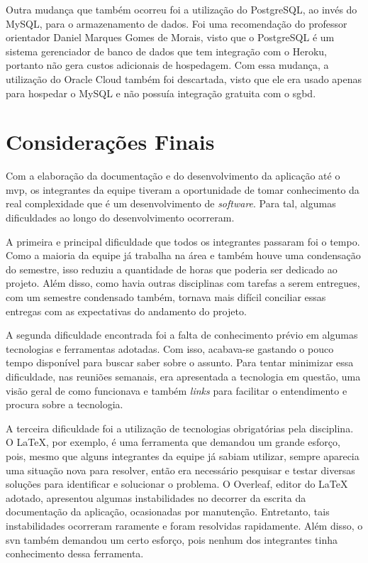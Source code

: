 \documentclass[
    12pt,               %
    openright,          %
    oneside,
    a4paper,            %
    english,            %
    brazil              %
    ]{ifsp-spo-inf-ctds} %
\begin{document}
Outra mudança que também ocorreu foi a utilização do PostgreSQL, ao invés do MySQL, para o armazenamento de dados. Foi uma recomendação do professor orientador Daniel Marques Gomes de Morais, visto que o PostgreSQL é um sistema gerenciador de banco de dados que tem integração com o Heroku, portanto não gera custos adicionais de hospedagem. Com essa mudança, a utilização do Oracle Cloud também foi descartada, visto que ele era usado apenas para hospedar o MySQL e não possuía integração gratuita com o \ac{sgbd}.



\chapter[Considerações Finais]{Considerações Finais}

Com a elaboração da documentação e do desenvolvimento da aplicação até o \ac{mvp}, os integrantes da equipe tiveram a oportunidade de tomar conhecimento da real complexidade que é um desenvolvimento de \textit{\gls{software}}. Para tal, algumas dificuldades ao longo do desenvolvimento ocorreram. 

A primeira e principal dificuldade que todos os integrantes passaram foi o tempo. Como a maioria da equipe já trabalha na área e também houve uma condensação do semestre, isso reduziu a quantidade de horas que poderia ser dedicado ao projeto. Além disso, como havia outras disciplinas com tarefas a serem entregues, com um semestre condensado também, tornava mais difícil conciliar essas entregas com as expectativas do andamento do projeto.

A segunda dificuldade encontrada foi a falta de conhecimento prévio em algumas tecnologias e ferramentas adotadas. Com isso, acabava-se gastando o pouco tempo disponível para buscar saber sobre o assunto. Para tentar minimizar essa dificuldade, nas reuniões semanais, era apresentada a tecnologia em questão, uma visão geral de como funcionava e também \textit{links} para facilitar o entendimento e procura sobre a tecnologia.

A terceira dificuldade foi a utilização de tecnologias obrigatórias pela disciplina. O LaTeX, por exemplo, é uma ferramenta que demandou um grande esforço, pois, mesmo que alguns integrantes da equipe já sabiam utilizar, sempre aparecia uma situação nova para resolver, então era necessário pesquisar e testar diversas soluções para identificar e solucionar o problema. O Overleaf, editor do LaTeX adotado, apresentou algumas instabilidades no decorrer da escrita da documentação da aplicação, ocasionadas por manutenção. Entretanto, tais instabilidades ocorreram raramente e foram resolvidas rapidamente. Além disso, o \gls{svn} também demandou um certo esforço, pois nenhum dos integrantes tinha conhecimento dessa ferramenta.
\end{document}
